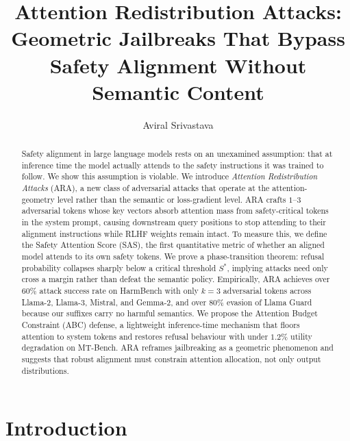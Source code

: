 \documentclass[sigconf,anonymous=false,review=false]{acmart}
\theoremstyle{definition}
\theoremstyle{remark}
\begin{document}
\title{Attention Redistribution Attacks: Geometric Jailbreaks That Bypass Safety Alignment Without Semantic Content}

\author{Aviral Srivastava}

\renewcommand{\shortauthors}{Srivastava}

\begin{abstract}
Safety alignment in large language models rests on an unexamined assumption: that at inference time the model actually attends to the safety instructions it was trained to follow. We show this assumption is violable. We introduce \emph{Attention Redistribution Attacks} (ARA), a new class of adversarial attacks that operate at the attention-geometry level rather than the semantic or loss-gradient level. ARA crafts $1$--$3$ adversarial tokens whose key vectors absorb attention mass from safety-critical tokens in the system prompt, causing downstream query positions to stop attending to their alignment instructions while RLHF weights remain intact. To measure this, we define the Safety Attention Score (SAS), the first quantitative metric of whether an aligned model attends to its own safety tokens. We prove a phase-transition theorem: refusal probability collapses sharply below a critical threshold $S^*$, implying attacks need only cross a margin rather than defeat the semantic policy. Empirically, ARA achieves over $60\%$ attack success rate on HarmBench with only $k=3$ adversarial tokens across Llama-2, Llama-3, Mistral, and Gemma-2, and over $80\%$ evasion of Llama Guard because our suffixes carry no harmful semantics. We propose the Attention Budget Constraint (ABC) defense, a lightweight inference-time mechanism that floors attention to system tokens and restores refusal behaviour with under $1.2\%$ utility degradation on MT-Bench. ARA reframes jailbreaking as a geometric phenomenon and suggests that robust alignment must constrain attention allocation, not only output distributions.
\end{abstract}


\maketitle

\section{Introduction}
\label{sec:intro}
\end{document}
